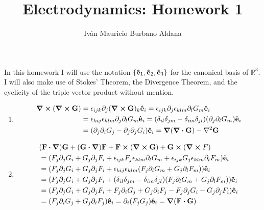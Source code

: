 \documentclass{article}
\title{Electrodynamics: Homework 1}
\author{Iván Mauricio Burbano Aldana}
\begin{document}
\maketitle

In this homework I will use the notation $\{\vu{e}_1,\vu{e}_2,\vu{e}_3\}$ for the canonical basis of $\mathbb{R}^3$. I will also make use of Stokes' Theorem, the Divergence Theorem, and the cyclicity of the triple vector product without mention.

\begin{enumerate}

\item \begin{align}
\begin{split}
\curl(\curl{\vb{G}})&=\epsilon_{ijk}\partial_j(\curl{\vb{G}})_k\vu{e}_i=\epsilon_{ijk}\partial_j\epsilon_{klm}\partial_lG_m\vu{e}_i\\
&=\epsilon_{kij}\epsilon_{klm}\partial_j\partial_l G_m\vu{e}_i = (\delta_{il}\delta_{jm}-\delta_{im}\delta_{jl})(\partial_j\partial_l G_m)\vu{e}_i\\
&=(\partial_j\partial_i G_j - \partial_j\partial_j G_i)\vu{e}_i =\grad(\div{\vb{G}})-\laplacian\vb{G}
\end{split}
\end{align}

\item \begin{align}
\begin{split}
&(\vb{F}\vdot\grad)\vb{G}+(\vb{G}\vdot\grad)\vb{F}+\vb{F}\cross(\curl{\vb{G}})+\vb{G}\cross(\curl{F})\\
&= (F_j\partial_jG_i+G_j\partial_jF_i+\epsilon_{ijk}F_j\epsilon_{klm}\partial_lG_m+\epsilon_{ijk}G_j\epsilon_{klm}\partial_lF_m)\vu{e}_i\\
&= (F_j\partial_jG_i+G_j\partial_jF_i+\epsilon_{kij}\epsilon_{klm}(F_j\partial_lG_m+G_j\partial_lF_m))\vu{e}_i\\
&= (F_j\partial_jG_i+G_j\partial_jF_i+(\delta_{il}\delta_{jm}-\delta_{im}\delta_{jl})(F_j\partial_lG_m+G_j\partial_lF_m))\vu{e}_i\\
&= (F_j\partial_jG_i+G_j\partial_jF_i+F_j\partial_iG_j+G_j\partial_iF_j-F_j\partial_jG_i-G_j\partial_jF_i)\vu{e}_i\\
&=(F_j\partial_iG_j+G_j\partial_iF_j)\vu{e}_i=\partial_i(F_jG_j)\vu{e}_i=\grad(\vb{F}\vdot\vb{G})
\end{split}
\end{align}


\end{enumerate}
\end{document}
